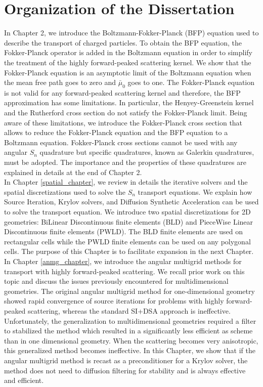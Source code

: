 \section{Organization of the Dissertation}
\noindent In Chapter 2, we introduce the Boltzmann-Fokker-Planck (BFP)
equation used to describe the transport of charged particles. To obtain the
BFP equation, the Fokker-Planck operator is added in the Boltzmann equation in 
order to simplify
the treatment of the highly forward-peaked scattering kernel. We show that the
Fokker-Planck equation is an asymptotic limit of the Boltzmann equation when the
mean free path goes to zero and $\bar{\mu}_0$ goes to one. The Fokker-Planck
equation is not valid for any forward-peaked scattering kernel and
therefore, the BFP approximation has some limitations. In particular, the 
Henyey-Greenstein kernel and the Rutherford cross section do not satisfy the 
Fokker-Planck limit.
Being aware of these limitations, we introduce the Fokker-Planck cross
section that allows to reduce the Fokker-Planck equation and the BFP equation
to a Boltzmann equation. Fokker-Planck cross sections cannot be used with any
angular $S_n$
quadrature but specific quadratures, known as Galerkin quadratures, must be adopted.
The importance and the properties of these quadratures are explained in
details at the end of Chapter 2.\\

\noindent In Chapter \ref{spatial_chapter}, we review in details the iterative
solvers and the spatial discretizations used to solve the $S_n$ transport 
equations. We explain how Source Iteration, Krylov solvers, and Diffusion 
Synthetic Acceleration can be used to solve the transport equation.
We introduce two spatial discretizations for 2D geometries: BiLinear 
Discontinuous finite elements (BLD) and PieceWise 
Linear Discontinuous finite elements (PWLD). The BLD finite elements are used 
on rectangular cells while the PWLD finite elements can be used on any polygonal 
cells. The purpose of this Chapter is to facilitate expansion in the next
Chapter.\\

\noindent In Chapter \ref{anmg_chapter}, we introduce the angular multigrid 
methods for transport with highly forward-peaked scattering. We recall  
prior work on this topic and discuss the issues previously encountered for 
multidimensional geometries. The original angular multigrid method for 
one-dimensional geometry showed rapid convergence of source iterations for 
problems with highly forward-peaked scattering, whereas the standard SI+DSA
approach is ineffective. Unfortunately, the 
generalization to multidimensional geometries required a filter to stabilized 
the method which resulted in a significantly less efficient as scheme than in 
one dimensional geometry. When 
the scattering becomes very anisotropic, this generalized method becomes
ineffective. In this Chapter, we show that if the angular multigrid method is 
recast as a preconditioner for a Krylov solver, the method does not need to
diffusion filtering for stability and is always effective and efficient.\\

